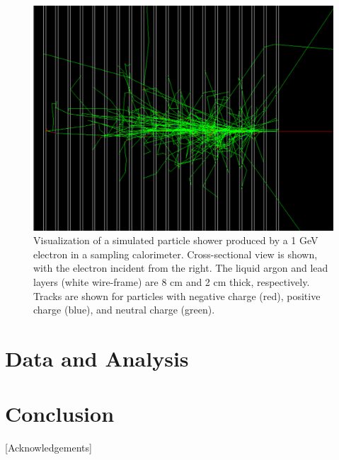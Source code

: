 \documentclass[%
 reprint,
 amsmath,amssymb,
 aps,
]{revtex4-2}
\begin{document}
\begin{figure}[H]
\centering
\includegraphics[width=0.75\columnwidth]{shower.png}%
\caption{\label{fig:epsart} Visualization of a simulated particle shower produced by a 1 GeV electron in a sampling calorimeter. Cross-sectional view is shown, with the electron incident from the right. The liquid argon and lead layers (white wire-frame) are 8 cm and 2 cm thick, respectively. Tracks are shown for particles with negative charge (red), positive charge (blue), and neutral charge (green). }
\end{figure}


\section{Data and Analysis}









\section{Conclusion}



\begin{acknowledgments}

[Acknowledgements]

\end{acknowledgments}


\appendix


\end{document}
